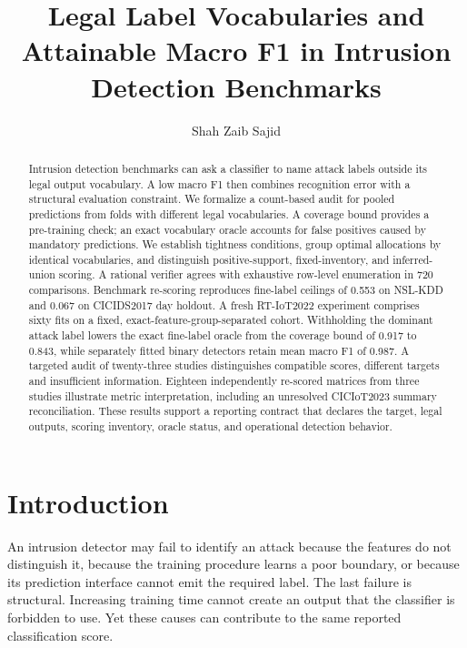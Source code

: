 \documentclass[twocolumn]{svjour3}
\begin{document}
\title{Legal Label Vocabularies and Attainable Macro F1 in Intrusion Detection Benchmarks}
\author{Shah Zaib Sajid}
\date{}
\maketitle
\begin{abstract}
Intrusion detection benchmarks can ask a classifier to name attack labels outside its legal output vocabulary. A low macro F1 then combines recognition error with a structural evaluation constraint. We formalize a count-based audit for pooled predictions from folds with different legal vocabularies. A coverage bound provides a pre-training check; an exact vocabulary oracle accounts for false positives caused by mandatory predictions. We establish tightness conditions, group optimal allocations by identical vocabularies, and distinguish positive-support, fixed-inventory, and inferred-union scoring. A rational verifier agrees with exhaustive row-level enumeration in 720 comparisons. Benchmark re-scoring reproduces fine-label ceilings of 0.553 on NSL-KDD and 0.067 on CICIDS2017 day holdout. A fresh RT-IoT2022 experiment comprises sixty fits on a fixed, exact-feature-group-separated cohort. Withholding the dominant attack label lowers the exact fine-label oracle from the coverage bound of 0.917 to 0.843, while separately fitted binary detectors retain mean macro F1 of 0.987. A targeted audit of twenty-three studies distinguishes compatible scores, different targets and insufficient information. Eighteen independently re-scored matrices from three studies illustrate metric interpretation, including an unresolved CICIoT2023 summary reconciliation. These results support a reporting contract that declares the target, legal outputs, scoring inventory, oracle status, and operational detection behavior.\end{abstract}
\section{Introduction}
An intrusion detector may fail to identify an attack because the features do not distinguish it, because the training procedure learns a poor boundary, or because its prediction interface cannot emit the required label. The last failure is structural. Increasing training time cannot create an output that the classifier is forbidden to use. Yet these causes can contribute to the same reported classification score.
\end{document}
